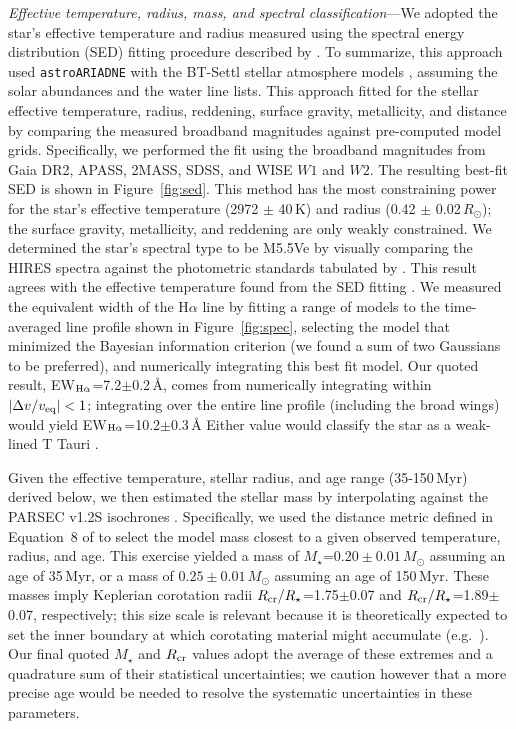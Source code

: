 \documentclass{nature3}
\begin{document}
\begin{methods}
{\it Effective temperature, radius, mass, and spectral classification}---We adopted
the star's effective temperature and radius measured using the spectral
energy distribution (SED) fitting procedure described by
\cite{Bouma2024}.  To summarize, this approach used
\texttt{astroARIADNE} \cite{Vines2022} with the BT-Settl stellar
atmosphere models \cite{Allard2012}, assuming the \cite{Asplund2009}
solar abundances and the \cite{Barber2006} water line lists.  This
approach fitted for the stellar effective temperature, radius,
reddening, surface gravity, metallicity, and distance by comparing the
measured broadband magnitudes against pre-computed model grids.
Specifically, we performed the fit using the broadband magnitudes from
Gaia DR2, APASS, 2MASS, SDSS, and WISE $W1$ and $W2$.  The resulting
best-fit SED is shown in Figure~\ref{fig:sed}.  This method has the most
constraining power for the star's effective temperature (2972 $\pm$
40\,K) and radius (0.42 $\pm$ 0.02\,$R_\odot$); the surface gravity,
metallicity, and reddening are only weakly constrained.  We
determined the star's spectral type to be M5.5Ve by visually comparing
the HIRES spectra against the photometric standards tabulated by
\cite{Bochanski2007}.   This result agrees with the effective
temperature found from the SED fitting \cite{Pecaut2013}.
We measured the equivalent width of the H$\alpha$ line by fitting a
range of models to the time-averaged line profile shown in
Figure~\ref{fig:spec}, selecting the model that minimized the Bayesian
information criterion (we found a sum of two Gaussians to be preferred), and numerically
integrating this best fit model.
Our quoted result, EW$_{{\rm H}\alpha}$=7.2$\pm$0.2\,\AA, comes from
numerically integrating within $|\Delta v/v_{\rm eq}|<1$; 
integrating over the entire line profile (including the broad wings) would yield
EW$_{{\rm H}\alpha}$=10.2$\pm$0.3\,\AA
Either value would classify the star as a weak-lined T Tauri \cite{Briceno2019}.

Given the effective temperature, stellar radius, and age range
(35-150\,Myr) derived below, we then estimated the stellar mass by
interpolating against the PARSEC v1.2S isochrones \cite{Chen2014}.
Specifically, we used the distance metric defined in Equation~8 of
\cite{Bouma2024} to select the model mass closest to a given observed
temperature, radius, and age.  This exercise yielded a mass of
$M_\star$=$0.20\pm0.01$\,$M_\odot$ assuming an age of 35\,Myr, or a mass
of $0.25\pm0.01$\,$M_\odot$ assuming an age of 150\,Myr.  These masses
imply Keplerian corotation radii $R_{\rm cr}/R_\star$=1.75$\pm$0.07 and
$R_{\rm cr}/R_\star$=1.89$\pm$0.07, respectively; this size scale is
relevant because it is theoretically expected to set the inner boundary
at which corotating material might accumulate
(e.g.~\cite{Townsend2005,Daley-Yates2024}).  Our final quoted $M_\star$
and $R_{\rm cr}$ values adopt the average of these extremes and a
quadrature sum of their statistical uncertainties; we caution however
that a more precise age would be needed to resolve the systematic
uncertainties in these parameters.



\end{methods}
\end{document}
